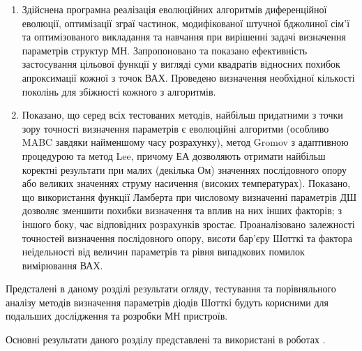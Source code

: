 \begin{enumerate}[leftmargin=0cm,itemindent=3em]
    \item Здійснена програмна реалізація еволюційних алгоритмів  диференційної еволюції, оптимізації зграї частинок,
модифікованої штучної бджолиної сім'ї та оптимізованого викладання та навчання при вирішенні задачі визначення параметрів структур МН.
Запропоновано та показано ефективність застосування цільової функції у вигляді суми квадратів відносних похибок апроксимації кожної з точок ВАХ.
Проведено визначення необхідної кількості поколінь для збіжності кожного з алгоритмів.

   \item Показано, що серед всіх тестованих методів, найбільш придатними з точки зору точності визначення параметрів є еволюційні алгоритми (особливо MABC завдяки найменшому часу розрахунку), метод Gromov з адаптивною процедурою та метод Lee, причому ЕА дозволяють отримати найбільш коректні результати при малих (декілька Ом) значеннях послідовного опору або великих значеннях струму насичення (високих температурах).
    Показано, що використання функції Ламберта при числовому визначенні параметрів ДШ дозволяє зменшити похибки визначення та вплив на них інших факторів; з іншого боку, час відповідних розрахунків зростає.
    Проаналізовано залежності точностей визначення послідовного опору, висоти бар'єру Шотткі та фактора неідельності від величин параметрів та рівня випадкових помилок вимірювання ВАХ.

  \end{enumerate}

Предсталені в даному розділі результати огляду, тестування та порівняльного аналізу методів визначення параметрів діодів Шотткі будуть корисними для подальших дослідження та розробки
МН пристроїв.

Основні результати даного розділу представлені та використані в роботах \cite{Olikh:Rev,6CPFCS,OlikhJAP,Olikh:Ultras2016,Olikh2016JSem}.
